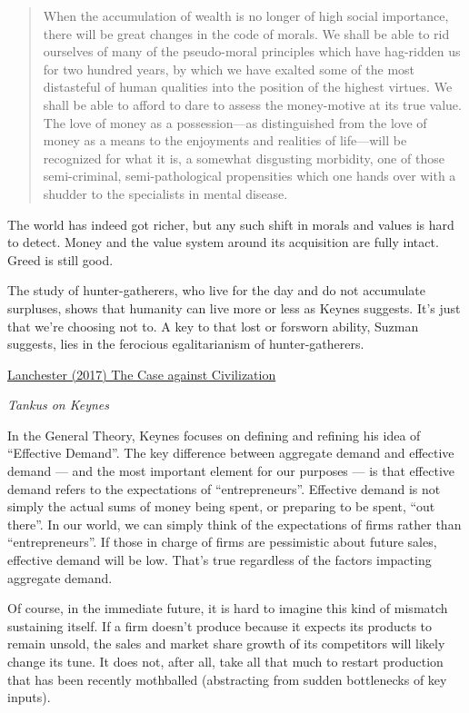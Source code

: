 \documentclass[
]{book}
\begin{document}
\begin{quote}
When the accumulation of wealth is no longer of high social importance, there will be great changes in the code of morals. We shall be able to rid ourselves of many of the pseudo-moral principles which have hag-ridden us for two hundred years, by which we have exalted some of the most distasteful of human qualities into the position of the highest virtues. We shall be able to afford to dare to assess the money-motive at its true value. The love of money as a possession---as distinguished from the love of money as a means to the enjoyments and realities of life---will be recognized for what it is, a somewhat disgusting morbidity, one of those semi-criminal, semi-pathological propensities which one hands over with a shudder to the specialists in mental disease.
\end{quote}

The world has indeed got richer, but any such shift in morals and values is hard to detect. Money and the value system around its acquisition are fully intact. Greed is still good.

The study of hunter-gatherers, who live for the day and do not accumulate surpluses, shows that humanity can live more or less as Keynes suggests. It's just that we're choosing not to. A key to that lost or forsworn ability, Suzman suggests, lies in the ferocious egalitarianism of hunter-gatherers.

\href{https://www.newyorker.com/magazine/2017/09/18/the-case-against-civilization}{Lanchester (2017) The Case against Civilization}

\emph{Tankus on Keynes}

In the General Theory, Keynes focuses on defining and refining his idea of ``Effective Demand''. The key difference between aggregate demand and effective demand --- and the most important element for our purposes --- is that effective demand refers to the expectations of ``entrepreneurs''. Effective demand is not simply the actual sums of money being spent, or preparing to be spent, ``out there''. In our world, we can simply think of the expectations of firms rather than ``entrepreneurs''. If those in charge of firms are pessimistic about future sales, effective demand will be low. That's true regardless of the factors impacting aggregate demand.

Of course, in the immediate future, it is hard to imagine this kind of mismatch sustaining itself. If a firm doesn't produce because it expects its products to remain unsold, the sales and market share growth of its competitors will likely change its tune. It does not, after all, take all that much to restart production that has been recently mothballed (abstracting from sudden bottlenecks of key inputs).
\end{document}
